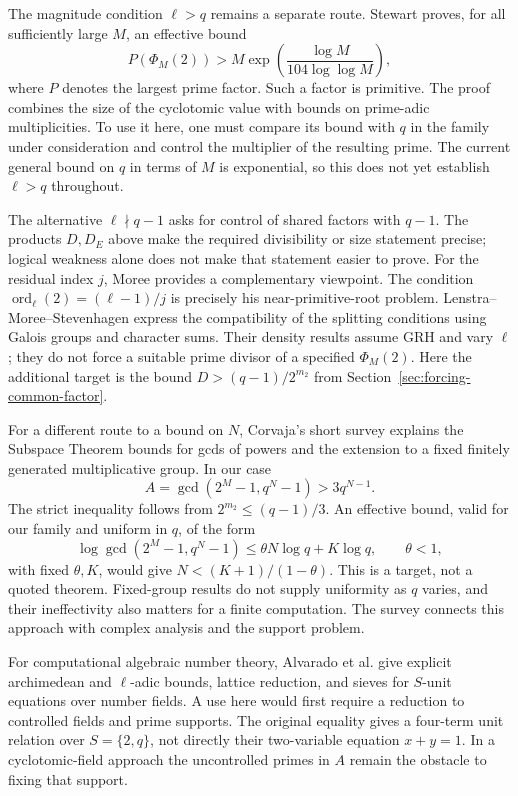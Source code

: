 \documentclass[11pt]{article}
\begin{document}
The magnitude condition $\ell>q$ remains a separate route.
Stewart \cite[Theorem 1.1, \S5]{Stewart} proves, for all sufficiently
large $M$, an effective bound
\[
P(\Phi_M(2))>
M\exp\!\left(\frac{\log M}{104\log\log M}\right),
\]
where $P$ denotes the largest prime factor. Such a factor is primitive.
The proof combines the size of the cyclotomic value with bounds on
prime-adic multiplicities. To use it here, one must compare its bound
with $q$ in the family under consideration and control the multiplier
of the resulting prime. The current general bound on $q$ in terms
of $M$ is exponential, so this does not yet establish $\ell>q$ throughout.

The alternative $\ell\nmid q-1$ asks for control of shared factors
with $q-1$. The products $D,D_E$ above make the required divisibility
or size statement precise; logical weakness alone does not make
that statement easier to prove.
For the residual index $j$, Moree \cite[\S\S1,5,6]{MoreeNear}
provides a complementary viewpoint.
The condition $\operatorname{ord}_\ell(2)=(\ell-1)/j$ is precisely
his near-primitive-root problem. Lenstra--Moree--Stevenhagen
\cite[\S\S2,5,6]{LMS} express the compatibility of the splitting
conditions using Galois groups and character sums. Their density
results assume GRH and vary $\ell$; they do not force a suitable
prime divisor of a specified $\Phi_M(2)$. Here the additional target
is the bound $D>(q-1)/2^{m_2}$ from
Section~\ref{sec:forcing-common-factor}.

For a different route to a bound on $N$, Corvaja's short survey
\cite[\S1]{CorvajaSurvey} explains the Subspace Theorem bounds for
gcds of powers and the extension to a fixed finitely generated
multiplicative group. In our case
\[
A=\gcd(2^M-1,q^N-1)>3q^{N-1}.
\]
The strict inequality follows from $2^{m_2}\le(q-1)/3$.
An effective bound, valid for our family and uniform in $q$, of the form
\[
\log\gcd(2^M-1,q^N-1)
 \le\theta N\log q+K\log q,\qquad \theta<1,
\]
with fixed $\theta,K$, would give $N<(K+1)/(1-\theta)$.
This is a target, not a quoted theorem. Fixed-group results do not
supply uniformity as $q$ varies, and their ineffectivity also matters
for a finite computation. The survey connects this approach with
complex analysis and the support problem.

For computational algebraic number theory, Alvarado et al.
\cite[\S\S3--6]{SUnitAlgorithms} give explicit archimedean and
$\ell$-adic bounds, lattice reduction, and sieves for $S$-unit equations
over number fields. A use here would first require a reduction to
controlled fields and prime supports. The original equality gives a
four-term unit relation over $S=\{2,q\}$, not directly their
two-variable equation $x+y=1$. In a cyclotomic-field approach the
uncontrolled primes in $A$ remain the obstacle to fixing that support.
\end{document}
